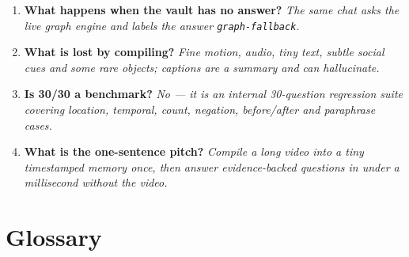 \documentclass[10pt,a4paper]{article}
\newcommand{\code}[1]{\texttt{\small #1}}
\begin{document}
\begin{enumerate}[leftmargin=1.4em,itemsep=3pt]
  \item \textbf{What happens when the vault has no answer?} \emph{The same chat asks the live graph
        engine and labels the answer \code{graph-fallback}.}
  \item \textbf{What is lost by compiling?} \emph{Fine motion, audio, tiny text, subtle social cues
        and some rare objects; captions are a summary and can hallucinate.}
  \item \textbf{Is 30/30 a benchmark?} \emph{No --- it is an internal 30-question regression suite
        covering location, temporal, count, negation, before/after and paraphrase cases.}
  \item \textbf{What is the one-sentence pitch?} \emph{Compile a long video into a tiny timestamped
        memory once, then answer evidence-backed questions in under a millisecond without the video.}
\end{enumerate}

\section{Glossary}
\end{document}
